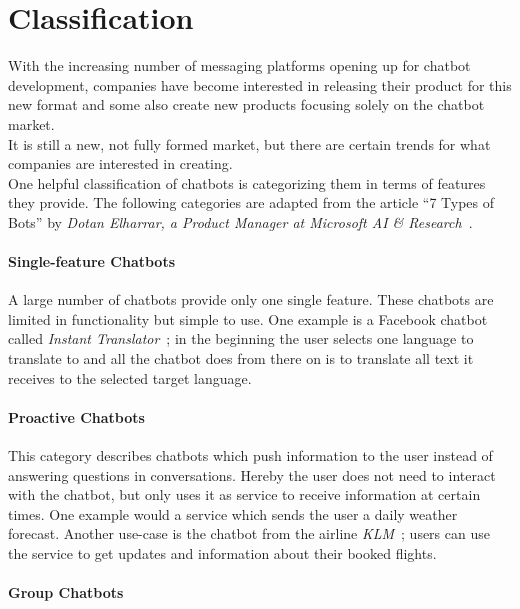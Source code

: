 \section{Classification}
\label{classification}


With the increasing number of messaging platforms opening up for chatbot development,
companies have become interested in releasing their product for this new format and some also create new products focusing solely on the chatbot market.
\\

It is still a new, not fully formed market, but there are certain trends for what companies are interested in creating.
\\

One helpful classification of chatbots is categorizing them in terms of features they provide.
The following categories are adapted from the article ``7 Types of Bots'' by \emph{Dotan Elharrar, a Product Manager at Microsoft AI \& Research}~\cite{bottypes}.


\paragraph{Single-feature Chatbots}

A large number of chatbots provide only one single feature.
These chatbots are limited in functionality but simple to use.
One example is a Facebook chatbot called \emph{Instant Translator}~\cite{instanttranslator};
in the beginning the user selects one language to translate to and all the chatbot does from there on is to translate all text it receives to the selected target language.


\paragraph{Proactive Chatbots}

This category describes chatbots which push information to the user instead of answering questions in conversations.
Hereby the user does not need to interact with the chatbot, but only uses it as service to receive information at certain times.
One example would a service which sends the user a daily weather forecast.
Another use-case is the chatbot from the airline \emph{KLM}~\cite{klm}; users can use the service to get updates and information about their booked flights.


\paragraph{Group Chatbots}

